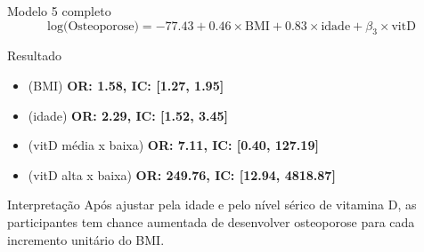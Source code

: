 \documentclass{beamer}
\begin{document}
\begin{frame}{\scriptsize }
  \begin{exampleblock}{Modelo 5 completo}
    \tiny
    \begin{displaymath}
      \text{log(Osteoporose)} =-77.43 + 0.46 \times\text{BMI} + 0.83 \times\text{idade} + \beta_3 \times\text{vitD}
    \end{displaymath}
  \end{exampleblock}
  \begin{block}{Resultado}
    \footnotesize
    \begin{itemize}
      \scriptsize
    \item {\small (BMI)} {\bf OR: 1.58, IC: [1.27, 1.95]}
      \medskip
    \item {\small (idade)} {\bf OR: 2.29, IC: [1.52, 3.45]}
      \medskip
    \item {\small (vitD média x baixa)} {\bf OR: 7.11, IC: [0.40, 127.19]}
      \medskip
    \item {\small (vitD alta x baixa)} {\bf OR: 249.76, IC: [12.94, 4818.87]}
    \end{itemize}
  \end{block}
    \begin{block}{Interpretação}
    \footnotesize
    Após ajustar pela idade e pelo nível sérico de vitamina D, as participantes tem chance aumentada de desenvolver osteoporose para cada incremento unitário do BMI.
  \end{block}
\end{frame}
\end{document}
